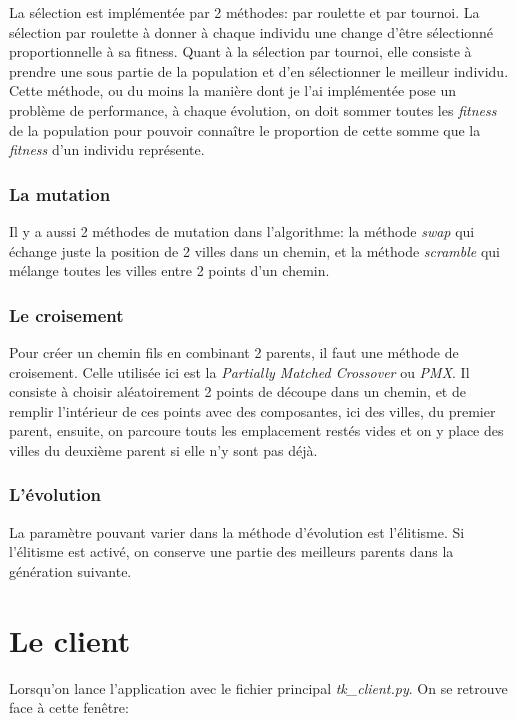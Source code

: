 \documentclass[11pt]{article}
\begin{document}
La sélection est implémentée par 2 méthodes: par roulette et par tournoi. La sélection par
roulette à donner à chaque individu une change d'être sélectionné proportionnelle à sa
fitness. Quant à la sélection par tournoi, elle consiste à prendre une sous partie
de la population et d'en sélectionner le meilleur individu. Cette méthode, ou du moins la manière dont je l'ai
implémentée pose un problème de performance, à chaque évolution, on doit sommer toutes les \emph{fitness} de la population
pour pouvoir connaître le proportion de cette somme que la \emph{fitness} d'un individu représente.

\subsubsection{La mutation}

Il y a aussi 2 méthodes de mutation dans l'algorithme: la méthode \emph{swap} qui échange juste
la position de 2 villes dans un chemin, et la méthode \emph{scramble} qui mélange toutes les villes
entre 2 points d'un chemin.

\subsubsection{Le croisement}

Pour créer un chemin fils en combinant 2 parents, il faut une méthode de croisement. Celle utilisée ici
est la \emph{Partially Matched Crossover} ou \emph{PMX}. Il consiste à choisir aléatoirement 2 points de découpe
dans un chemin, et de remplir l'intérieur de ces points avec des composantes, ici des villes, du premier parent,
ensuite, on parcoure touts les emplacement restés vides et on y place des villes du deuxième parent si elle n'y sont pas
déjà.

\subsubsection{L'évolution}

La paramètre pouvant varier dans la méthode d'évolution est l'élitisme. Si l'élitisme
est activé, on conserve une partie des meilleurs parents dans la génération suivante.


\section{Le client}

Lorsqu'on lance l'application avec le fichier principal \emph{tk\_client.py}. On se retrouve face à cette fenêtre:
\end{document}
